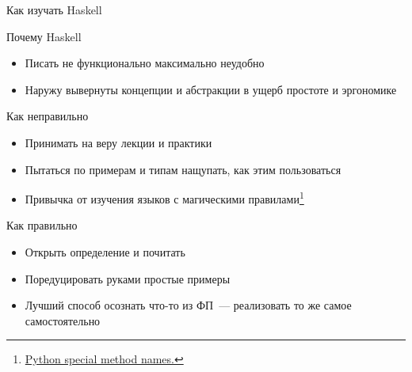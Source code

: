     \begin{frame}{Как изучать Haskell}
        \begin{block}{Почему Haskell}
            \begin{itemize}
                \item Писать не функционально максимально неудобно
                \item Наружу вывернуты концепции и абстракции в ущерб простоте и эргономике
            \end{itemize}
        \end{block}
        \pause
        \begin{block}{\color{red} Как неправильно}
            \begin{itemize}
                \item Принимать на веру лекции и практики
                \item Пытаться по примерам и типам нащупать, как этим пользоваться
                \item Привычка от изучения языков с магическими правилами\footnote{\href{https://docs.python.org/3/reference/datamodel.html\#special-method-names}{\color{blue} Python special method names.}}
            \end{itemize}
        \end{block}
        \pause
        \begin{block}{\color{green} Как правильно}
            \begin{itemize}
                \item Открыть определение и почитать
                \item Поредуцировать руками простые примеры
                \item Лучший способ осознать что-то из ФП~--- реализовать то же самое самостоятельно
            \end{itemize}
        \end{block}
    \end{frame}








